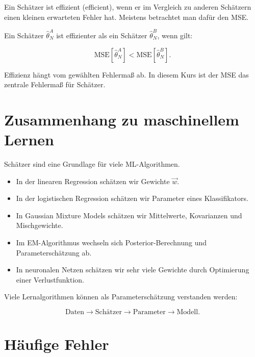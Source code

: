 Ein Schätzer ist effizient (efficient), wenn er im Vergleich zu anderen Schätzern einen kleinen erwarteten Fehler hat.
Meistens betrachtet man dafür den MSE.

\begin{definitionbox}
Ein Schätzer \(\hat{\theta}^{A}_N\) ist effizienter als ein Schätzer \(\hat{\theta}^{B}_N\), wenn gilt:

\[
    \mathrm{MSE}[\hat{\theta}^{A}_N]
    <
    \mathrm{MSE}[\hat{\theta}^{B}_N].
\]
\end{definitionbox}

\begin{notebox}
Effizienz hängt vom gewählten Fehlermaß ab.
In diesem Kurs ist der MSE das zentrale Fehlermaß für Schätzer.
\end{notebox}

\section{Zusammenhang zu maschinellem Lernen}

Schätzer sind eine Grundlage für viele ML-Algorithmen.

\begin{itemize}
    \item In der linearen Regression schätzen wir Gewichte \(\vec{w}\).
    \item In der logistischen Regression schätzen wir Parameter eines Klassifikators.
    \item In Gaussian Mixture Models schätzen wir Mittelwerte, Kovarianzen und Mischgewichte.
    \item Im EM-Algorithmus wechseln sich Posterior-Berechnung und Parameterschätzung ab.
    \item In neuronalen Netzen schätzen wir sehr viele Gewichte durch Optimierung einer Verlustfunktion.
\end{itemize}

\begin{conceptbox}
Viele Lernalgorithmen können als Parameterschätzung verstanden werden:

\[
    \text{Daten}
    \longrightarrow
    \text{Schätzer}
    \longrightarrow
    \text{Parameter}
    \longrightarrow
    \text{Modell}.
\]
\end{conceptbox}

\section{Häufige Fehler}

